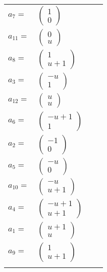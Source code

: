 \documentclass[1p]{elsarticle_modified}
\theoremstyle{definition}
\begin{document}
\begin{tabular}{m{7pt} m{180pt} m{7pt} m{180pt} }
\flushright $a_{7}=$&$\begin{pmatrix}1\\0\end{pmatrix}$ \\
\flushright $a_{11}=$&$\begin{pmatrix}0\\u\end{pmatrix}$ \\
\flushright $a_{8}=$&$\begin{pmatrix}1\\u+1\end{pmatrix}$ \\
\flushright $a_{3}=$&$\begin{pmatrix}- u\\1\end{pmatrix}$ \\
\flushright $a_{12}=$&$\begin{pmatrix}u\\u\end{pmatrix}$ \\
\flushright $a_{6}=$&$\begin{pmatrix}- u+1\\1\end{pmatrix}$ \\
\flushright $a_{2}=$&$\begin{pmatrix}-1\\0\end{pmatrix}$ \\
\flushright $a_{5}=$&$\begin{pmatrix}- u\\0\end{pmatrix}$ \\
\flushright $a_{10}=$&$\begin{pmatrix}- u\\u+1\end{pmatrix}$ \\
\flushright $a_{4}=$&$\begin{pmatrix}- u+1\\u+1\end{pmatrix}$ \\
\flushright $a_{1}=$&$\begin{pmatrix}u+1\\u\end{pmatrix}$ \\
\flushright $a_{9}=$&$\begin{pmatrix}1\\u+1\end{pmatrix}$\\&\end{tabular}
\end{document}

